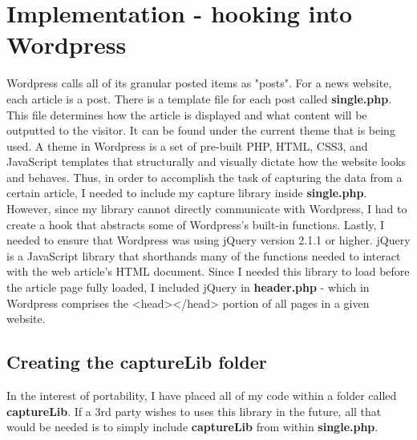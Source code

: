 \documentclass[12pt]{article}
\begin{document}
\section{Implementation - hooking into Wordpress}
Wordpress calls all of its granular posted items as "posts". For a news website, each article is a post. There is a template file for each post called \textbf{single.php}. This file determines how the article is displayed and what content will be outputted to the visitor. It can be found under the current theme that is being used. A theme in Wordpress is a set of pre-built PHP, HTML, CSS3, and JavaScript templates that structurally and visually dictate how the website looks and behaves. Thus, in order to accomplish the task of capturing the data from a certain article, I needed to include my capture library inside \textbf{single.php}. However, since my library cannot directly communicate with Wordpress, I had to create a hook that abstracts some of Wordpress's built-in functions. Lastly, I needed to ensure that Wordpress was using jQuery version 2.1.1 or higher. jQuery is a JavaScript library that shorthands many of the functions needed to interact with the web article's HTML document. Since I needed this library to load before the article page fully loaded, I included jQuery in \textbf{header.php} - which in Wordpress comprises the <head></head> portion of all pages in a given website. 

\newpage 

\subsection{Creating the captureLib folder}
In the interest of portability, I have placed all of my code within a folder called \textbf{captureLib}. If a 3rd party wishes to uses this library in the future, all that would be needed is to simply include \textbf{captureLib} from within \textbf{single.php}. \\
\end{document}
